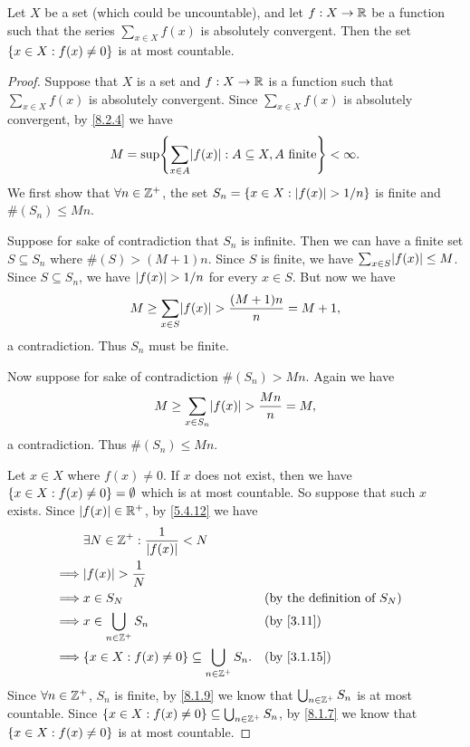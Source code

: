 \begin{lem}\label{8.2.5}
  Let \(X\) be a set (which could be uncountable), and let \(f : X \to \mathbb{R}\) be a function such that the series \(\sum_{x \in X} f(x)\) is absolutely convergent.
  Then the set \(\left\lbrace x \in X : f(x) \neq 0\right\rbrace\) is at most countable.
\end{lem}

\begin{proof}
  Suppose that \(X\) is a set and \(f : X \to \mathbb{R}\) is a function such that \(\sum_{x \in X} f(x)\) is absolutely convergent.
  Since \(\sum_{x \in X} f(x)\) is absolutely convergent, by \cref{8.2.4} we have
  \[
    M = \sup\set{\sum_{x \in A} \abs{f(x)} : A \subseteq X, A \text{ finite}} < \infty.
  \]
  We first show that \(\forall n \in \mathbb{Z}^+\), the set \(S_n = \left\lbrace x \in X : \left\lvert f(x)\right\rvert > 1 / n\right\rbrace\) is finite and \(\#(S_n) \leq Mn\).

  Suppose for sake of contradiction that \(S_n\) is infinite.
  Then we can have a finite set \(S \subseteq S_n\) where \(\#(S) > (M + 1)n\).
  Since \(S\) is finite, we have \(\sum_{x \in S} \abs{f(x)} \leq M\).
  Since \(S \subseteq S_n\), we have \(\left\lvert f(x)\right\rvert > 1 / n\) for every \(x \in S\).
  But now we have
  \[
    M \geq \sum_{x \in S} \abs{f(x)} > \dfrac{(M + 1)n}{n} = M + 1,
  \]
  a contradiction.
  Thus \(S_n\) must be finite.

  Now suppose for sake of contradiction \(\#(S_n) > Mn\).
  Again we have
  \[
    M \geq \sum_{x \in S_n} \abs{f(x)} > \dfrac{Mn}{n} = M,
  \]
  a contradiction.
  Thus \(\#(S_n) \leq Mn\).

  Let \(x \in X\) where \(f(x) \neq 0\).
  If \(x\) does not exist, then we have \(\left\lbrace x \in X : f(x) \neq 0\right\rbrace = \emptyset\) which is at most countable.
  So suppose that such \(x\) exists.
  Since \(\left\lvert f(x)\right\rvert \in \mathbb{R}^+\), by \cref{5.4.12} we have
  \begin{align*}
             & \exists N \in \Z^+ : \dfrac{1}{\abs{f(x)}} < N                                                             \\
    \implies & \abs{f(x)} > \dfrac{1}{N}                                                                                  \\
    \implies & x \in S_N                                                       &  & \text{(by the definition of \(S_N\))} \\
    \implies & x \in \bigcup_{n \in \Z^+} S_n                                  &  & \text{(by \cref{3.11})}               \\
    \implies & \set{x \in X : f(x) \neq 0} \subseteq \bigcup_{n \in \Z^+} S_n. &  & \by{3.1.15}
  \end{align*}
  Since \(\forall n \in \mathbb{Z}^+\), \(S_n\) is finite, by \cref{8.1.9} we know that \(\bigcup_{n \in \mathbb{Z}^+} S_n\) is at most countable.
  Since \(\left\lbrace x \in X : f(x) \neq 0\right\rbrace \subseteq \bigcup_{n \in \mathbb{Z}^+} S_n\), by \cref{8.1.7} we know that \(\left\lbrace x \in X : f(x) \neq 0\right\rbrace\) is at most countable.
\end{proof}

